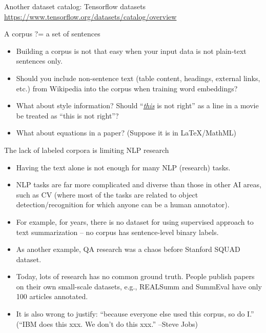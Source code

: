 \documentclass[11pt, handout]{beamer}
\begin{document}
\begin{frame}{Another dataset catalog: Tensorflow datasets}
  \url{https://www.tensorflow.org/datasets/catalog/overview}
\end{frame}

\begin{frame}{A corpus ?= a set of sentences }
 \begin{itemize}
  \item Building a corpus is not that easy when your input data is not plain-text sentences only. 
  \item Should you include non-sentence text (table content, headings, external links, etc.) from Wikipedia into the corpus when training word embeddings? 
  \item What about style information? Should ``\underline{\textit{this}} is not right'' as a line in a movie be treated as ``this is not right''? 
  \item What about equations in a paper? (Suppose it is in \LaTeX/MathML) 
 \end{itemize}
\end{frame}

\begin{frame}{The lack of labeled corpora is limiting NLP research}
 \begin{itemize}[<+->]
  \item Having the text alone is not enough for many NLP (research) tasks. 
  \item NLP tasks are far more complicated and diverse than those in other AI areas, such as CV (where most of the tasks are related to object detection/recognition for which anyone can be a human annotator).
  \item For example, for years, there is no dataset for using supervised approach to text summarization -- no corpus has sentence-level binary labels. 
  \item As another example, QA research was a chaos before Stanford SQUAD dataset. 
  \item Today, lots of research has no common ground truth. People publish papers on their own small-scale datasets, e.g., REALSumm and SummEval have only 100 articles annotated.
  \item It is also wrong to justify: ``because everyone else used this corpus, so do I.'' (``IBM does this xxx. We don't do this xxx.'' --Steve Jobs)
 \end{itemize}
\end{frame}
\end{document}
